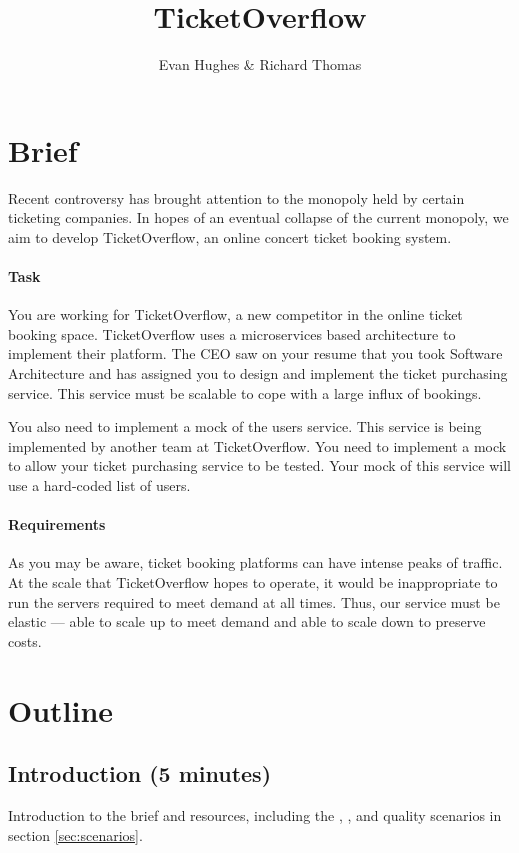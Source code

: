 \documentclass{csse4400}
\title{TicketOverflow}
\author{Evan Hughes \& Richard Thomas}
\date{\week[tutorial]{9}}
\begin{document}
\maketitle


\section{Brief}

Recent controversy has brought attention to the monopoly held by certain ticketing companies.
In hopes of an eventual collapse of the current monopoly,
we aim to develop TicketOverflow,
an online concert ticket booking system.

\paragraph{Task}
You are working for TicketOverflow,
a new competitor in the online ticket booking space.
Ticket\-Overflow uses a microservices based architecture to implement their platform.
The CEO saw on your resume that you took Software Architecture and has assigned you to design and implement the ticket purchasing service.
This service must be scalable to cope with a large influx of bookings.

You also need to implement a mock of the users service.
This service is being implemented by another team at TicketOverflow.
You need to implement a mock to allow your ticket purchasing service to be tested.
Your mock of this service will use a hard-coded list of users.

\paragraph{Requirements}
As you may be aware,
ticket booking platforms can have intense peaks of traffic.
At the scale that TicketOverflow hopes to operate,
it would be inappropriate to run the servers required to meet demand at all times.
Thus, our service must be elastic --- able to scale up to meet demand and able to scale down to preserve costs.


\section{Outline}

\subsection*{Introduction (5 minutes)}
Introduction to the brief and resources,
including the ,
,
and quality scenarios in section \ref{sec:scenarios}.
\end{document}
